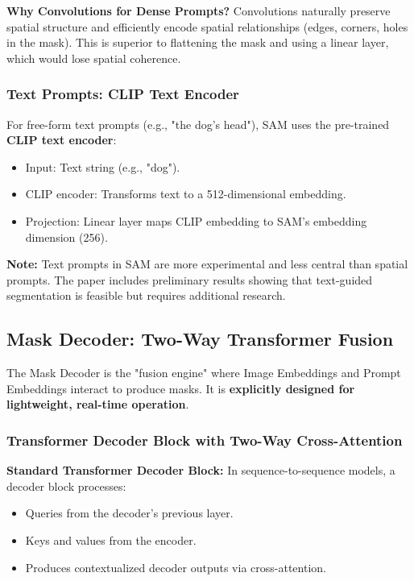 \textbf{Why Convolutions for Dense Prompts?}
Convolutions naturally preserve spatial structure and efficiently encode spatial relationships (edges, corners, holes in the mask). This is superior to flattening the mask and using a linear layer, which would lose spatial coherence.

\subsubsection{Text Prompts: CLIP Text Encoder}

For free-form text prompts (e.g., "the dog's head"), SAM uses the pre-trained \textbf{CLIP text encoder}:
\begin{itemize}
    \item Input: Text string (e.g., "dog").
    \item CLIP encoder: Transforms text to a 512-dimensional embedding.
    \item Projection: Linear layer maps CLIP embedding to SAM's embedding dimension (256).
\end{itemize}

\textbf{Note:} Text prompts in SAM are more experimental and less central than spatial prompts. The paper includes preliminary results showing that text-guided segmentation is feasible but requires additional research.

\subsection{Mask Decoder: Two-Way Transformer Fusion}

The Mask Decoder is the "fusion engine" where Image Embeddings and Prompt Embeddings interact to produce masks. It is \textbf{explicitly designed for lightweight, real-time operation}.

\subsubsection{Transformer Decoder Block with Two-Way Cross-Attention}

\textbf{Standard Transformer Decoder Block:}
In sequence-to-sequence models, a decoder block processes:
\begin{itemize}
    \item Queries from the decoder's previous layer.
    \item Keys and values from the encoder.
    \item Produces contextualized decoder outputs via cross-attention.
\end{itemize}

